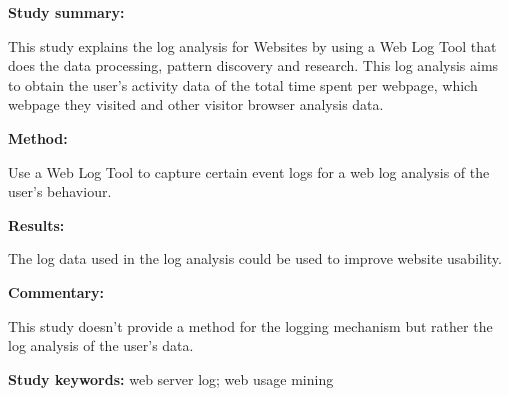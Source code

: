 \begin{tcolorbox}[colback=gray!5!white, colframe=pastelgreen!40!black, title=Analysis of visitor's behavior from Web Log using WebLog Expert Tool\cite{Kumar2017}]
	\begin{minipage}[t]{0.25\textwidth}
		\textbf{Study summary:}
	\end{minipage}
	\hfill
	\begin{minipage}[t]{0.65\textwidth}
		This study explains the log analysis for Websites by using a Web Log Tool that does the
		data processing, pattern discovery and research. This log analysis aims to obtain the user's
		activity data of the total time spent per webpage, which webpage they visited and other
		visitor browser analysis data.
	\end{minipage}

	\vspace{0.75em} 

	\begin{minipage}[t]{0.25\textwidth}
		\textbf{Method:}
	\end{minipage}
	\hfill
	\begin{minipage}[t]{0.65\textwidth}
		Use a Web Log Tool to capture certain event logs for a web log analysis of the user's behaviour.
	\end{minipage}

	\vspace{0.75em} 

	\begin{minipage}[t]{0.25\textwidth}
		\textbf{Results:}
	\end{minipage}
	\hfill
	\begin{minipage}[t]{0.65\textwidth}
		The log data used in the log analysis could be used to improve website usability.
	\end{minipage}

	\vspace{0.75em} 

	\begin{minipage}[t]{0.25\textwidth}
		\textbf{Commentary:}
	\end{minipage}
	\hfill
	\begin{minipage}[t]{0.65\textwidth}
		This study doesn't provide a method for the logging mechanism but rather the log analysis of
		the user's data.  
	\end{minipage}
	\tcblower
	\textbf{Study keywords:} web server log; web usage mining
\end{tcolorbox}